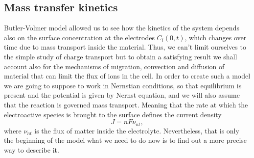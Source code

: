 \subsection{Mass transfer kinetics}

Butler-Volmer model allowed us to see how the kinetics of the system depends also on the surface concentration at the electrodes $C_i(0,t)$, which changes over time due to mass transport inside the material. Thus, we can't limit ourselves to the simple study of charge transport but to obtain a satisfying result we shall account also for the mechanisms of migration, convection and diffusion of material that can limit the flux of ions in the cell. In order to create such a model we are going to suppose to work in Nernstian conditions, so that equilibrium is present and the potential is given by Nernst equation, and we will also assume that the reaction is governed mass transport. Meaning that the rate at which the electroactive species is brought to the surface defines the current density
\begin{equation}
    J = nF\nu_{nt},
\end{equation}
where $\nu_{nt}$ is the flux of matter inside the electrolyte. Nevertheless, that is only the beginning of the model what we need to do now is to find out a more precise way to describe it.

